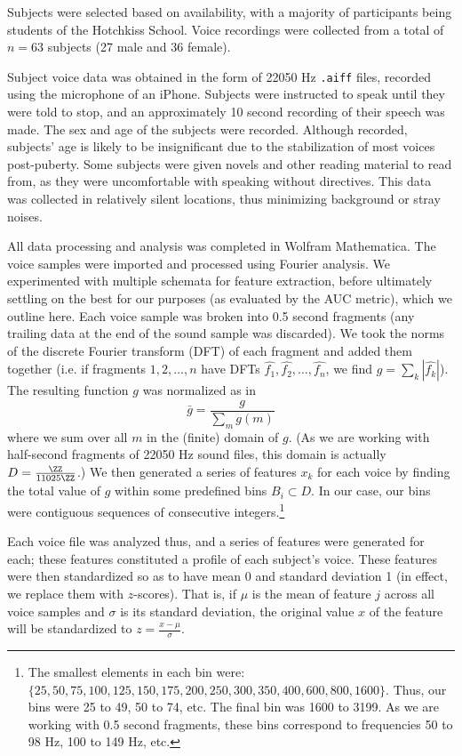 \documentclass[10pt]{article}
\begin{document}

Subjects were selected based on availability, with a majority of participants being students of the Hotchkiss School.
Voice recordings were collected from a total of $n = 63$ subjects (27 male and 36 female). 

Subject voice data was obtained in the form of 22050 Hz \texttt{.aiff} files, recorded using the microphone of an iPhone.
Subjects were instructed to speak until they were told to stop, and an approximately 10 second recording of their speech was made.
The sex and age of the subjects were recorded.
Although recorded, subjects' age is likely to be insignificant due to the stabilization of most voices post-puberty. Some subjects were given novels and other reading material to read from, as they were uncomfortable with speaking without directives.
This data was collected in relatively silent locations, thus minimizing background or stray noises. 

All data processing and analysis was completed in Wolfram Mathematica.
The voice samples were imported and processed using Fourier analysis.
We experimented with multiple schemata for feature extraction, before ultimately settling on the best for our purposes (as evaluated by the AUC metric), which we outline here.
Each voice sample was broken into 0.5 second fragments (any trailing data at the end of the sound sample was discarded).
We took the norms of the discrete Fourier transform (DFT) of each fragment and added them together (i.e. if fragments $1, 2, \dots, n$ have DFTs $\hat{f_1},\hat{f_2}, \dots, \hat{f_n}$, we find $g = \sum_k |\hat{f_k}|$). The resulting function $g$ was normalized as in \[\bar{g} = \frac{g}{\sum\limits_m g(m)}\] where we sum over all $m$ in the (finite) domain of $g$.
(As we are working with half-second fragments of 22050 Hz sound files, this domain is actually $D = \frac{\ZZ}{11025\ZZ}$.)
We then generated a series of features $x_k$ for each voice by finding the total value of $g$ within some predefined bins $B_i\subset D$. In our case, our bins were contiguous sequences of consecutive integers.\footnote{The smallest elements in each bin were: $\{25, 50, 75, 100, 125, 150, 175, 200, 250, 300, 350, 400, 600, 800, 1600\}$. Thus, our bins were 25 to 49, 50 to 74, etc. The final bin was 1600 to 3199. As we are working with 0.5 second fragments, these bins correspond to frequencies 50 to 98 Hz, 100 to 149 Hz, etc.}

Each voice file was analyzed thus, and a series of features were generated for each; these features constituted a profile of each subject's voice.
These features were then standardized so as to have mean 0 and standard deviation 1 (in effect, we replace them with $z$-scores).
That is, if $\mu$ is the mean of feature $j$ across all voice samples and $\sigma$ is its standard deviation, the original value $x$ of the feature will be standardized to $z = \frac{x - \mu}{\sigma}$.
\end{document}
